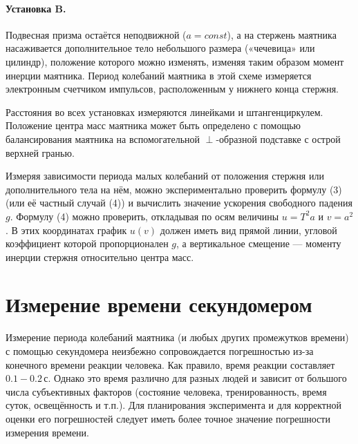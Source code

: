 \documentclass[12pt,a4paper]{scrartcl}
\begin{document}
	

	\paragraph{Установка B.} Подвесная призма остаётся неподвижной ($a = const$), а на стержень маятника насаживается дополнительное тело небольшого размера («чечевица» или цилиндр), положение которого можно изменять, изменяя таким образом момент инерции маятника. Период колебаний маятника в этой схеме измеряется электронным счетчиком импульсов, расположенным у нижнего конца стержня.

	

	Расстояния во всех установках измеряются линейками и штангенциркулем. Положение центра масс маятника может быть определено с помощью балансирования маятника на вспомогательной $\perp$-образной подставке с острой верхней гранью.

	

	Измеряя зависимости периода малых колебаний от положения стержня или дополнительного тела на нём, можно экспериментально проверить формулу (3) (или её частный случай (4)) и вычислить значение ускорения свободного падения $g$. Формулу (4) можно проверить, откладывая по осям величины $u = T^2 a$ и $v = a^2$ . В этих координатах график $u(v)$ должен иметь вид прямой линии, угловой коэффициент которой пропорционален $g$, а вертикальное смещение --- моменту инерции стержня относительно центра масс.
	
	\section{Измерение времени секундомером}
	
	Измерение периода колебаний маятника (и любых других промежутков времени) с помощью секундомера неизбежно сопровождается погрешностью из-за конечного времени реакции человека. Как правило, время реакции составляет $0.1-0.2\,$с. Однако это время различно для разных людей и зависит от большого числа субъективных факторов (состояние человека, тренированность, время суток, освещённость и т.п.). Для планирования эксперимента и для корректной оценки его погрешностей следует иметь
	более точное значение погрешности измерения времени.
	
\end{document}
